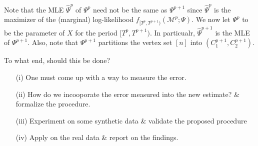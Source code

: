 \documentclass[12pt]{article}%
\begin{document}
Note that the MLE $\widehat{\Psi}^p$ of $\Psi^p$ need not be the same as $\Psi^{p+1}$ since $\widehat{\Psi}^p$ is the maximizer of the (marginal) log-likelihood $f_{[T^p,T^{p+1})}(\mathcal M^p;\Psi)$.  We now let 
$\Psi^p$ to be the parameter of $X$ for the period $[T^p,T^{p+1})$.  In particualr, $\widehat{\Psi}^{p+1}$ is the MLE of $\Psi^{p+1}$.  Also, note that $\Psi^{p+1}$ partitions the vertex set $[n]$ into $(C_1^{p+1},C_2^{p+1})$. 

To what end, should this be done?  
\begin{enumerate}
\item[(i)]  One must come up with a way to measure the error.
\item[(ii)] How do we incooporate the error measured into the new estimate? \& formalize the procedure.
\item[(iii)]  Experiment on some synthetic data \& validate the proposed procedure
\item[(iv)] Apply on the real data \& report on the findings.
\end{enumerate}
\end{document}
